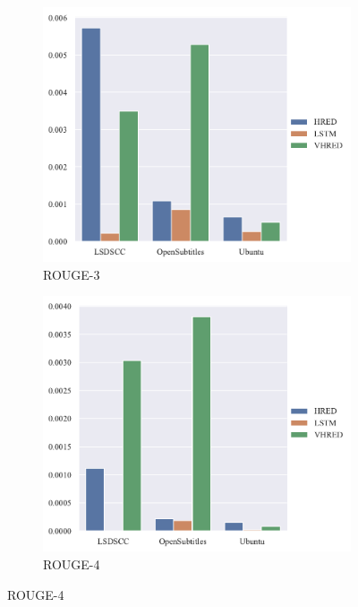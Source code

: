 \begin{figure}[H]
    \begin{subfigure}{0.4\linewidth}
        \centering
        \includegraphics[width=\linewidth]{figure/barplot/rouge_3/plot.pdf}
        \caption{ROUGE-3}
    \end{subfigure}%
    \begin{subfigure}{0.4\linewidth}
        \centering
        \includegraphics[width=\linewidth]{figure/barplot/rouge_4/plot.pdf}
        \caption{ROUGE-4}
    \end{subfigure}
    \centering
\end{figure}

